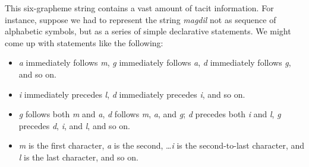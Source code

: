 \begin{definition}
This six-grapheme string contains a vast amount of tacit information. For instance, 
suppose we had to represent the string \textit{magdil} not as sequence of alphabetic 
symbols, but as a series of simple declarative statements. We might come up with 
statements like the following: 
\begin{itemize}
  \item \textit{a} immediately follows \textit{m}, \textit{g} immediately follows \textit{a}, \textit{d} immediately follows \textit{g}, and so on. 
  \item \textit{i} immediately precedes \textit{l}, \textit{d} immediately precedes \textit{i}, and so on. %
   \item \textit{g} follows both \textit{m} and \textit{a}, \textit{d} follows \textit{m}, \textit{a}, and \textit{g}; \textit{d} precedes both \textit{i} and \textit{l}, \textit{g} precedes \textit{d}, \textit{i}, and \textit{l}, and so on.
   \item \textit{m} is the first character, \textit{a} is the second, \dots \textit{i} is the second-to-last character, and \textit{l} is the last character, and so on.

\end{itemize}
\end{definition}

